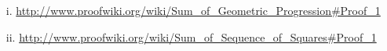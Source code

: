 \begin{enumerate}
  \item[i.] \url{http://www.proofwiki.org/wiki/Sum_of_Geometric_Progression#Proof_1}
  \item[ii.] \url{http://www.proofwiki.org/wiki/Sum_of_Sequence_of_Squares#Proof_1}
\end{enumerate}